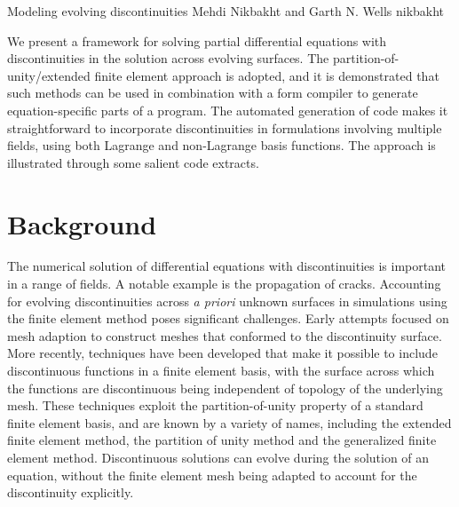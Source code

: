 \newcommand{\vect}[1]{\boldsymbol{#1}}
\newcommand{\dif}{\, d}
\newcommand{\disc}[1]{\left\llbracket {#1} \right\rrbracket}
\newcommand{\pd}{\partial}

\newcommand{\eps}{\epsilon}

              {Modeling evolving discontinuities}
              {Mehdi Nikbakht and Garth N. Wells}
              {nikbakht}

We present a framework for solving partial differential equations
with discontinuities in the solution across evolving surfaces. The
partition-of-unity/extended finite element approach is adopted, and
it is demonstrated that such methods can be used in combination with
a form compiler to generate equation-specific parts of a program. The
automated generation of code makes it straightforward to incorporate
discontinuities in formulations involving multiple fields, using both
Lagrange and non-Lagrange basis functions.  The approach is illustrated
through some salient code extracts.

\section{Background}

The numerical solution of differential equations with discontinuities is
important in a range of fields. A notable example is the propagation of
cracks. Accounting for evolving discontinuities across \emph{a priori}
unknown surfaces in simulations using the finite element method poses
significant challenges.  Early attempts focused on mesh adaption to
construct meshes that conformed to the discontinuity surface.  More
recently, techniques have been developed that make it possible to include
discontinuous functions in a finite element basis, with the surface across
which the functions are discontinuous being independent of topology of
the underlying mesh. These techniques exploit the partition-of-unity
property of a standard finite element basis, and are known by a variety
of names, including the extended finite element method, the partition of unity method and the generalized finite element method.  Discontinuous solutions can evolve during the
solution of an equation, without the finite element mesh being adapted
to account for the discontinuity explicitly.

